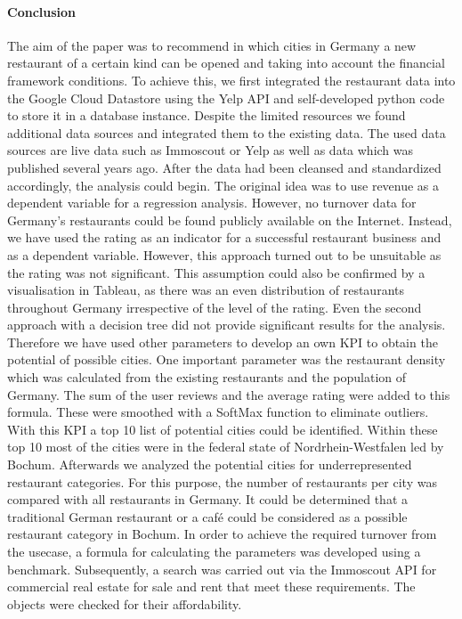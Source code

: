 \paragraph{Conclusion}
The aim of the paper was to recommend in which cities in Germany a new restaurant of a certain kind can be opened and taking into account the financial framework conditions. To achieve this, we first integrated the restaurant data into the Google Cloud Datastore using the Yelp API and self-developed python code to store it in a \pg{} database instance. Despite the limited resources we found additional data sources and integrated them to the existing data. The used data sources are live data such as Immoscout or Yelp as well as data which was published several years ago. After the data had been cleansed and standardized accordingly, the analysis could begin. The original idea was to use revenue as a dependent variable for a regression analysis. However, no turnover data for Germany's restaurants could be found publicly available on the Internet. Instead, we have used the rating as an indicator for a successful restaurant business and as a dependent variable. However, this approach turned out to be unsuitable as the rating was not significant. This assumption could also be confirmed by a visualisation in Tableau, as there was an even distribution of restaurants throughout Germany irrespective of the level of the rating. %
Even the second approach with a decision tree did not provide significant results for the analysis. Therefore we have used other parameters to develop an own KPI to obtain the potential of possible cities. One important parameter was the restaurant density which was calculated from the existing restaurants and the population of Germany. The sum of the user reviews and the average rating were added to this formula. These were smoothed with a SoftMax function to eliminate outliers. With this KPI a top 10 list of potential cities could be identified. Within these top 10 most of the cities were in the federal state of Nordrhein-Westfalen led by Bochum. Afterwards we analyzed the potential cities for underrepresented restaurant categories. For this purpose, the number of restaurants per city was compared with all restaurants in Germany. It could be determined that a traditional German restaurant or a café could be considered as a possible restaurant category in Bochum.
In order to achieve the required turnover from the usecase, a formula for calculating the parameters was developed using a benchmark. Subsequently, a search was carried out via the Immoscout API for commercial real estate for sale and rent that meet these requirements. The objects were checked for their affordability. %

